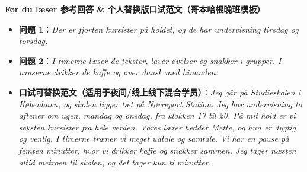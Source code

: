 \begin{answerbox}
\textbf{Før du læser 参考回答 \& 个人替换版口试范文（哥本哈根晚班模板）}
\begin{itemize}
  \item \textbf{问题 1}：\textit{Der er fjorten kursister på holdet, og de har undervisning tirsdag og torsdag.}
  \item \textbf{问题 2}：\textit{I timerne læser de tekster, laver øvelser og snakker i grupper. I pauserne drikker de kaffe og øver dansk med hinanden.}
  \item \textbf{口试可替换范文（适用于夜间/线上线下混合学员）}：\textit{Jeg går på Studieskolen i København, og skolen ligger tæt på Nørreport Station. Jeg har undervisning to aftener om ugen, mandag og onsdag, fra klokken 17 til 20. På mit hold er vi seksten kursister fra hele verden. Vores lærer hedder Mette, og hun er dygtig og venlig. I timerne træner vi meget udtale og samtale. Vi har en pause på femten minutter, hvor vi drikker kaffe og snakker sammen. Jeg tager næsten altid metroen til skolen, og det tager kun ti minutter.}
\end{itemize}
\end{answerbox}
